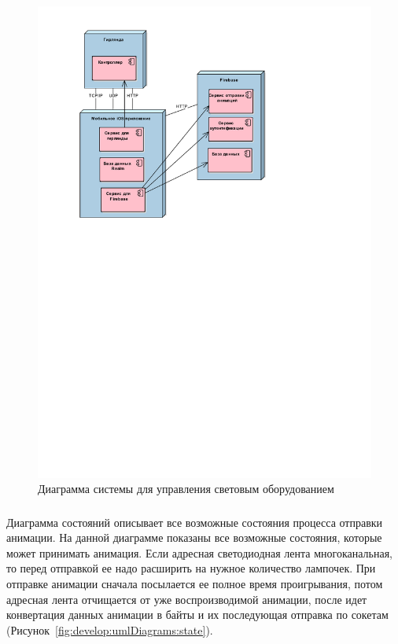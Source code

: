 ~
\begin{figure}[H]
\centering
	\includegraphics[scale=0.7]{figures/diagrams/uml_deployment.pdf}
	\caption{Диаграмма системы для управления световым оборудованием}
	\label{fig:develop:umlDiagrams:deployment}
\end{figure}

\vspace*{-\baselineskip}
\subsubsection{}	Диаграмма состояний описывает все возможные состояния процесса отправки анимации. На данной диаграмме показаны все возможные состояния, которые может принимать анимация. Если адресная светодиодная лента многоканальная, то перед отправкой ее надо расширить на нужное количество лампочек. При отправке анимации сначала посылается ее полное время проигрывания, потом адресная лента отчищается от уже воспроизводимой анимации, после идет конвертация данных анимации в байты и их последующая отправка по сокетам (Рисунок~\ref{fig:develop:umlDiagrams:state}).

